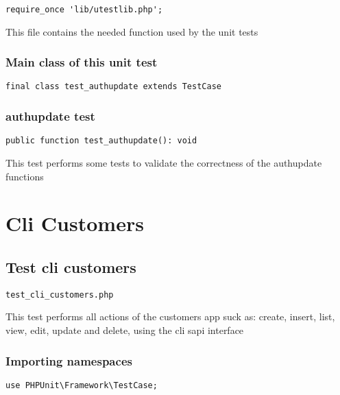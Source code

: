 \documentclass[a4paper]{article}
\begin{document}
\begin{lstlisting}
require_once 'lib/utestlib.php';
\end{lstlisting}

This file contains the needed function used by the unit tests

\hypertarget{toc54}{}
\subsubsection{Main class of this unit test}

\begin{lstlisting}
final class test_authupdate extends TestCase
\end{lstlisting}

\hypertarget{toc55}{}
\subsubsection{authupdate test}

\begin{lstlisting}
public function test_authupdate(): void
\end{lstlisting}

This test performs some tests to validate the correctness
of the authupdate functions


\hypertarget{toc56}{}
\section{Cli Customers}

\hypertarget{toc57}{}
\subsection{Test cli customers}

\begin{lstlisting}
test_cli_customers.php
\end{lstlisting}

This test performs all actions of the customers app suck as: create, insert,
list, view, edit, update and delete, using the cli sapi interface

\hypertarget{toc58}{}
\subsubsection{Importing namespaces}

\begin{lstlisting}
use PHPUnit\Framework\TestCase;
\end{lstlisting}
\end{document}
